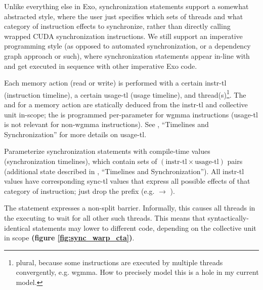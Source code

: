 Unlike everything else in Exo, synchronization statements support a somewhat abstracted style, where the user just specifies which sets of threads and what category of instruction effects to synchronize, rather than directly calling wrapped CUDA synchronization instructions.
We still support an imperative programming style (as opposed to automated synchronization, or a dependency graph approach or such), where synchronization statements appear in-line with and get executed in sequence with other imperative Exo code.

\filbreak
{} Each memory action (read or write) is performed with a certain instr-tl (instruction timeline), a certain usage-tl (usage timeline), and thread(s)\footnote{plural, because some instructions are executed by multiple threads convergently, e.g. wgmma. How to precisely model this is a hole in my current model.}.
The  and  for a memory action are statically deduced from the instr-tl and collective unit in-scope; the  is programmed per-parameter for wgmma instructions (usage-tl is not relevant for non-wgmma instructions).
See , ``Timelines and Synchronization'' for more details on usage-tl.

\filbreak
Parameterize synchronization statements with compile-time  values (synchronization timelines), which contain sets of $(\text{instr-tl} \times \text{usage-tl})$ pairs (additional state described in , ``Timelines and Synchronization'').
All instr-tl values have corresponding sync-tl values that express all possible effects of that category of instruction; just drop the  prefix (e.g.  $\to$ ).

\filbreak
{} The  statement expresses a non-split barrier.
Informally, this causes all threads in the executing  to wait for all other such threads.
This means that syntactically-identical  statements may lower to different code, depending on the collective unit in scope \textbf{(figure \ref{fig:sync_warp_cta})}.

